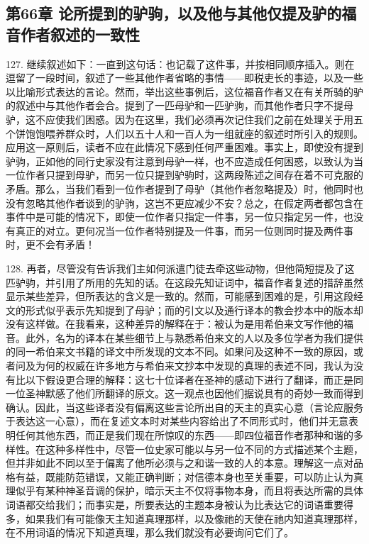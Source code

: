 
\subsection{第66章 论所提到的驴驹，以及他与其他仅提及驴的福音作者叙述的一致性}

127. 继续叙述如下：一直到这句话：也记载了这件事，并按相同顺序插入。则在逗留了一段时间，叙述了一些其他作者省略的事情——即税吏长的事迹，以及一些以比喻形式表达的言论。然而，举出这些事例后，这位福音作者又在有关所骑的驴的叙述中与其他作者会合。提到了一匹母驴和一匹驴驹，而其他作者只字不提母驴，这不应使我们困惑。因为在这里，我们必须再次记住我们之前在处理关于用五个饼饱饱喂养群众时，人们以五十人和一百人为一组就座的叙述时所引入的规则。应用这一原则后，读者不应在此情况下感到任何严重困难。事实上，即使没有提到驴驹，正如他的同行史家没有注意到母驴一样，也不应造成任何困惑，以致认为当一位作者只提到母驴，而另一位只提到驴驹时，这两段陈述之间存在着不可克服的矛盾。那么，当我们看到一位作者提到了母驴（其他作者忽略提及）时，他同时也没有忽略其他作者谈到的驴驹，这岂不更应减少不安？总之，在假定两者都包含在事件中是可能的情况下，即使一位作者只指定一件事，另一位只指定另一件，也没有真正的对立。更何况当一位作者特别提及一件事，而另一位则同时提及两件事时，更不会有矛盾！\par

128. 再者，尽管没有告诉我们主如何派遣门徒去牵这些动物，但他简短提及了这匹驴驹，并引用了所用的先知的话。在这段先知证词中，福音作者复述的措辞虽然显示某些差异，但所表达的含义是一致的。然而，可能感到困难的是，引用这段经文的形式似乎表示先知提到了母驴；而的引文以及通行译本的教会抄本中的版本却没有这样做。在我看来，这种差异的解释在于：被认为是用希伯来文写作他的福音。此外，名为的译本在某些细节上与熟悉希伯来文的人以及多位学者为我们提供的同一希伯来文书籍的译文中所发现的文本不同。如果问及这种不一致的原因，或者问及为何的权威在许多地方与希伯来文抄本中发现的真理的表述不同，我认为没有比以下假设更合理的解释：这七十位译者在圣神的感动下进行了翻译，而正是同一位圣神默感了他们所翻译的原文。这一观点也因他们据说具有的奇妙一致而得到确认。因此，当这些译者没有偏离这些言论所出自的天主的真实心意（言论应服务于表达这一心意），而在复述文本时对某些内容给出了不同形式时，他们并无意表明任何其他东西，而正是我们现在所惊叹的东西——即四位福音作者那种和谐的多样性。在这种多样性中，尽管一位史家可能以与另一位不同的方式描述某个主题，但并非如此不同以至于偏离了他所必须与之和谐一致的人的本意。理解这一点对品格有益，既能防范错误，又能正确判断；对信德本身也至关重要，可以防止认为真理似乎有某种神圣音调的保护，暗示天主不仅将事物本身，而且将表达所需的具体词语都交给我们；而事实是，所要表达的主题本身被认为比表达它的词语重要得多，如果我们有可能像天主知道真理那样，以及像祂的天使在祂内知道真理那样，在不用词语的情况下知道真理，那么我们就没有必要询问它们了。\par

